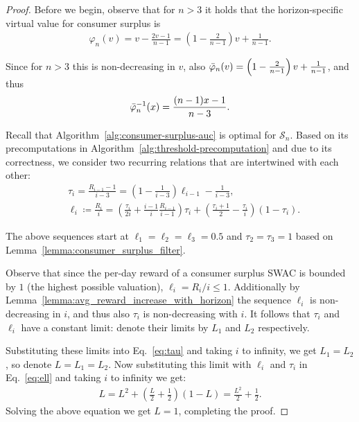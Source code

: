 \documentclass[11pt,letterpaper]{article}
\newcommand{\brackets}[1]{\left( #1 \right)}
\newcommand{\swac}{SWAC\xspace}
\renewcommand{\S}{\mathcal{S}}
\newcommand{\irn}{\Bar{\varphi}}
\theoremstyle{plain}
\begin{document}
\begin{proof}
    Before we begin, observe that for $n>3$ it holds that the horizon-specific virtual value for consumer surplus is 
    \begin{align*}
        \varphi_n(v)=v-\frac{2v-1}{n-1}=\brackets{1-\frac{2}{n-1}}v+\frac{1}{n-1}.
    \end{align*}

    Since for $n>3$ this is non-decreasing in $v$, also $ \irn_n(v)=\brackets{1-\frac{2}{n-1}}v+\frac{1}{n-1}$, and thus
    \begin{align*}
        \irn_n^{-1}(x)=\frac{(n-1)x-1}{n-3}.
    \end{align*}

    Recall that Algorithm~\ref{alg:consumer-surplus-auc} is optimal for $\S_n$. Based on its precomputations in Algorithm~\ref{alg:threshold-precomputation} and due to its correctness,
    we consider two recurring relations that are intertwined with each other:
    \begin{align}
        &\tau_i=\frac{R_{i-1}-1}{i-3}=\brackets{1-\frac{1}{i-3}}\ell_{i-1}-\frac{1}{i-3},\label{eq:tau}\\
        &\ell_i\coloneq\frac{R_i}{i}=\brackets{\frac{\tau_i}{2i}+\frac{i-1}{i}\frac{R_{i-1}}{i-1}}\tau_i+\brackets{\frac{\tau_i+1}{2}-\frac{\tau_i}{i}}\brackets{1-\tau_i}\label{eq:ell}.
    \end{align}

    The above sequences start at $\ell_1=\ell_2=\ell_3=0.5$ and $\tau_2=\tau_3=1$ based on Lemma~\ref{lemma:consumer_surplus_filter}.

    Observe that since the per-day reward of a consumer surplus \swac is bounded by $1$ (the highest possible valuation), $\ell_i=R_i/i\leq1$. Additionally by Lemma~\ref{lemma:avg_reward_increase_with_horizon} the sequence $\ell_i$ is non-decreasing in $i$, and thus also $\tau_i$ is non-decreasing with $i$. It follows that $\tau_i$ and $\ell_i$ have a constant limit: denote their limits by $L_1$ and $L_2$ respectively.

    Substituting these limits into Eq.~\ref{eq:tau} and taking $i$ to infinity, we get $L_1=L_2$, so denote $L=L_1=L_2$. Now substituting this limit with $\ell_i$ and $\tau_i$ in Eq.~\ref{eq:ell} and taking $i$ to infinity we get:
    \begin{align*}
        L=L^2+\brackets{\frac{L}{2}+\frac{1}{2}}\brackets{1-L}=\frac{L^2}{2}+\frac{1}{2}.
    \end{align*}
    Solving the above equation we get $L=1$, completing the proof.
\end{proof}
\end{document}
